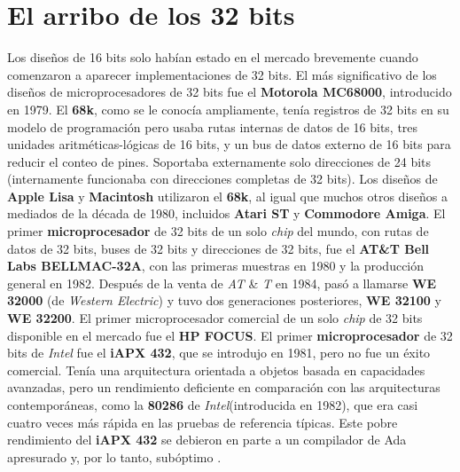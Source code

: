 \section{El arribo de los 32 bits}
Los diseños de 16 bits solo habían estado en el mercado brevemente cuando comenzaron a aparecer implementaciones de 32 bits.
El más significativo de los diseños de  microprocesadores de 32 bits fue el \textbf{Motorola MC68000}, introducido en 1979. 
El \textbf{68k}, como se le conocía ampliamente, tenía  registros de 32 bits en su modelo de programación pero usaba rutas internas
de datos de 16 bits, tres unidades aritméticas-lógicas de 16 bits, y un bus de datos externo de 16 bits para reducir 
el conteo de pines. Soportaba externamente solo direcciones de 24 bits (internamente funcionaba con direcciones completas de 
32 bits). Los diseños de \textbf{Apple Lisa} y \textbf{Macintosh} utilizaron el \textbf{68k}, al igual que muchos otros diseños a
mediados de la década de 1980, incluidos \textbf{Atari ST} y \textbf{Commodore Amiga}. El primer \textbf{microprocesador} de 32 bits de
un solo \emph{chip} del mundo, con rutas de datos de 32 bits, buses de 32 bits y direcciones de 32 bits, fue el \textbf{AT\&T Bell Labs BELLMAC-32A},
con las primeras muestras en 1980 y la producción general en 1982. Después de la venta de \emph{AT} \& \emph{T} en 1984, pasó a llamarse \textbf{WE 32000}
(de \emph{Western Electric}) y tuvo dos generaciones posteriores, \textbf{WE 32100} y \textbf{WE 32200}. El primer microprocesador comercial de
un solo \emph{chip} de 32 bits disponible en el mercado fue el \textbf{HP FOCUS}. El primer \textbf{microprocesador} de 32 bits de \emph{Intel} 
fue el \textbf{iAPX 432}, que se introdujo en 1981, pero no fue un éxito comercial. Tenía una arquitectura orientada a objetos basada en capacidades avanzadas,
pero un rendimiento deficiente en comparación con las arquitecturas contemporáneas, como la \textbf{80286} de \emph{Intel}(introducida en 1982),
que era casi cuatro veces más rápida en las pruebas de referencia típicas. Este pobre rendimiento del \textbf{iAPX 432} se debieron en parte a un
compilador de Ada apresurado y, por lo tanto, subóptimo .

